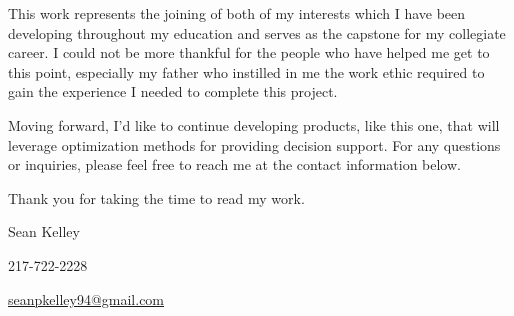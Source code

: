 \documentclass[letterpaper,10pt,english]{sphinxmanual}
\begin{document}
This work represents the joining of both of my interests which I have been
developing throughout my education and serves as the capstone for my
collegiate career. I could not be more thankful for the people who have
helped me get to this point, especially my father who instilled in me the
work ethic required to gain the experience I needed to complete this project.

Moving forward, I'd like to continue developing products, like this one, that
will leverage optimization methods for providing decision support. For any
questions or inquiries, please feel free to reach me at the contact
information below.

Thank you for taking the time to read my work.

Sean Kelley

217-722-2228

\href{mailto:seanpkelley94@gmail.com}{seanpkelley94@gmail.com}



\renewcommand{\indexname}{Index}
\printindex
\end{document}
